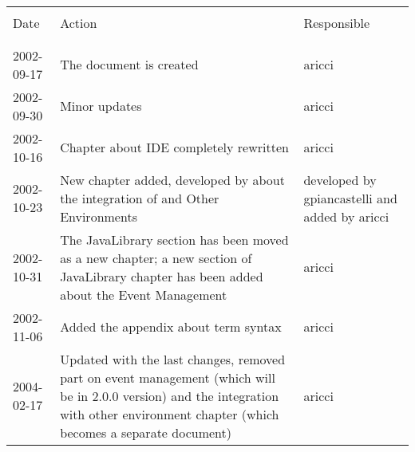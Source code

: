 \begin{table}[h]
    \begin{center}{\small\tt
    \begin{tabular}{p{2cm}|p{8cm}|p{2cm}}\hline\hline \\
    \large{Date} & \large{Action} & \large{Responsible} \\\\ \hline\hline\\
    2002-09-17 & The document is created & aricci \\ \hline
    2002-09-30 & Minor updates           & aricci \\ \hline
    2002-10-16 & Chapter about IDE completely rewritten & aricci \\ \hline
    2002-10-23 & New chapter added, developed by about the integration of
                 \tuprolog{} and Other Environments & developed by gpiancastelli
                                                      and added by aricci  \\ \hline
    2002-10-31 & The JavaLibrary section has been moved
                 as a new chapter; a new section of JavaLibrary
                 chapter has been added about the Event Management  & aricci \\ \hline

    2002-11-06 & Added the appendix about term syntax & aricci \\ \hline
    2004-02-17 & Updated with the last changes, removed part on event management 
                             (which will be in 2.0.0 version) and
                             the integration with other environment chapter (which becomes
                             a separate document) & aricci \\
    \hline
    \end{tabular}
    }\end{center}
\end{table}
